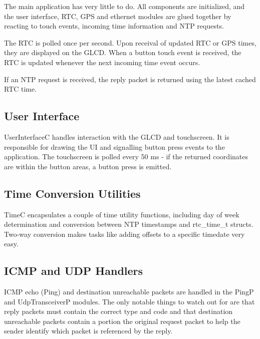 \documentclass[12pt,a4paper,titlepage,oneside]{article}
\begin{document}
The main application has very little to do. All components are initialized, and
the user interface, RTC, GPS and ethernet modules are glued together by
reacting to touch events, incoming time information and NTP requests.

The RTC is polled once per second. Upon receival of updated RTC or GPS times,
they are displayed on the GLCD. When a button touch event is received, the RTC
is updated whenever the next incoming time event occurs.

If an NTP request is received, the reply packet is returned using the latest
cached RTC time.

\subsection{User Interface}

UserInterfaceC handles interaction with the GLCD and touchscreen. It is
responsible for drawing the UI and signalling button press events to the
application. The touchscreen is polled every 50 ms - if the returned
coordinates are within the button areas, a button press is emitted.

\subsection{Time Conversion Utilities}

TimeC encapsulates a couple of time utility functions, including day of week
determination and conversion between NTP timestamps and rtc\_time\_t structs.
Two-way conversion makes tasks like adding offsets to a specific timedate very
easy.

\subsection{ICMP and UDP Handlers}

ICMP echo (Ping) and destination unreachable packets are handled in the PingP
and UdpTransceiverP modules. The only notable things to watch out for are that
reply packets must contain the correct type and code and that destination
unreachable packets contain a portion the original request packet to help the
sender identify which packet is referenced by the reply.
\end{document}
